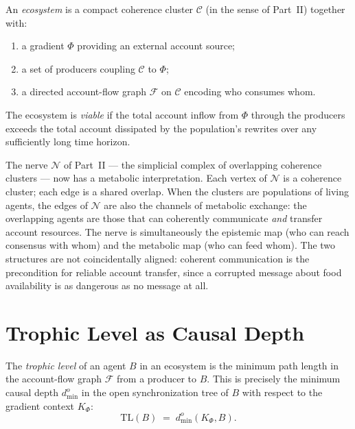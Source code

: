 \begin{definition}[Ecosystem]
An \emph{ecosystem} is a compact coherence cluster
$\mathcal{C}$ (in the sense of Part~II) together with:
\begin{enumerate}[label=(\roman*)]
  \item a gradient $\Phi$ providing an external account source;
  \item a set of producers coupling $\mathcal{C}$ to $\Phi$;
  \item a directed account-flow graph $\mathcal{F}$ on
        $\mathcal{C}$ encoding who consumes whom.
\end{enumerate}
The ecosystem is \emph{viable} if the total account inflow from
$\Phi$ through the producers exceeds the total account dissipated
by the population's rewrites over any sufficiently long time
horizon.
\end{definition}

\begin{remark}
The nerve $\mathcal{N}$ of Part~II --- the simplicial complex of
overlapping coherence clusters --- now has a metabolic
interpretation.
Each vertex of $\mathcal{N}$ is a coherence cluster; each edge
is a shared overlap.
When the clusters are populations of living agents, the edges of
$\mathcal{N}$ are also the channels of metabolic exchange: the
overlapping agents are those that can coherently communicate
\emph{and} transfer account resources.
The nerve is simultaneously the epistemic map (who can reach
consensus with whom) and the metabolic map (who can feed whom).
The two structures are not coincidentally aligned: coherent
communication is the precondition for reliable account transfer,
since a corrupted message about food availability is as
dangerous as no message at all.
\end{remark}

\section{Trophic Level as Causal Depth}

\begin{proposition}
\label{prop:trophic}
The \emph{trophic level} of an agent $B$ in an ecosystem is
the minimum path length in the account-flow graph $\mathcal{F}$
from a producer to $B$.
This is precisely the minimum causal depth $d^o_{\min}$ in the
open synchronization tree of $B$ with respect to the gradient
context $K_\Phi$:
\[
  \mathrm{TL}(B) \;=\; d^o_{\min}(K_\Phi, B).
\]
\end{proposition}

